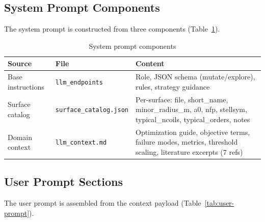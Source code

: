 \subsection{System Prompt Components}

The system prompt is constructed from three components (Table~\ref{tab:system-prompt}).

\begin{table}[t]
  \centering
  \caption{System prompt components}
  \label{tab:system-prompt}
  \begin{tabular}{@{}llp{6.5cm}@{}}
    \toprule
    \textbf{Source} & \textbf{File} & \textbf{Content} \\
    \midrule
    Base instructions & \texttt{llm\_endpoints} & Role, JSON schema (mutate/explore), rules, strategy guidance \\
    Surface catalog & \texttt{surface\_catalog.json} & Per-surface: file, short\_name, minor\_radius\_m, a0, nfp, stellsym, typical\_ncoils, typical\_orders, notes \\
    Domain context & \texttt{llm\_context.md} & Optimization guide, objective terms, failure modes, metrics, threshold scaling, literature excerpts (7 refs) \\
    \bottomrule
  \end{tabular}
\end{table}

\subsection{User Prompt Sections}

The user prompt is assembled from the context payload (Table~\ref{tab:user-prompt}).


